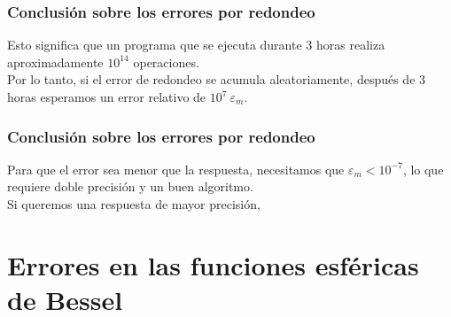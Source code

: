\begin{frame}
\frametitle{Conclusión sobre los errores por redondeo}
Esto significa que un programa que se ejecuta durante $3$ horas realiza aproximadamente $10^{14}$ operaciones.
\\
\bigskip
Por lo tanto, si el error de redondeo se acumula aleatoriamente, después de $3$ horas esperamos un error relativo de $10^{7} \: \varepsilon_{m}$.
\end{frame}
\begin{frame}
\frametitle{Conclusión sobre los errores por redondeo}
Para que el error sea menor que la respuesta, necesitamos que $\varepsilon_{m} < 10^{-7}$, lo que requiere doble precisión y un buen algoritmo.
\\
\bigskip
Si queremos una respuesta de mayor precisión, \emph{}
\end{frame}
\section{Errores en las funciones esféricas de Bessel}
